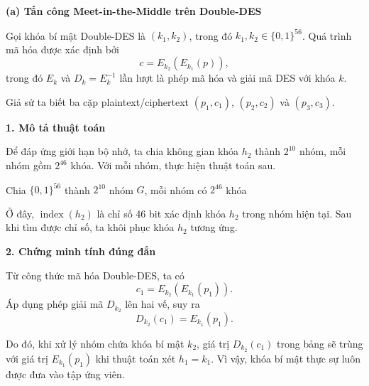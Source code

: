 \begin{loigiai}
\textbf{(a) Tấn công Meet-in-the-Middle trên Double-DES}

Gọi khóa bí mật Double-DES là $(k_1,k_2)$, trong đó
$k_1,k_2 \in \{0,1\}^{56}$. Quá trình mã hóa được xác định bởi
\[
c = E_{k_2}(E_{k_1}(p)),
\]
trong đó $E_k$ và $D_k=E_k^{-1}$ lần lượt là phép mã hóa
và giải mã DES với khóa $k$.

Giả sử ta biết ba cặp plaintext/ciphertext
$(p_1,c_1)$, $(p_2,c_2)$ và $(p_3,c_3)$.

\textbf{1. Mô tả thuật toán}

Để đáp ứng giới hạn bộ nhớ, ta chia không gian khóa $h_2$
thành $2^{10}$ nhóm, mỗi nhóm gồm $2^{46}$ khóa. Với mỗi
nhóm, thực hiện thuật toán sau.

\begin{algorithm}[H]
\caption{Tấn công Meet-in-the-Middle trên Double-DES}

Chia $\{0,1\}^{56}$ thành $2^{10}$ nhóm $G$, mỗi nhóm có
$2^{46}$ khóa\;

\end{algorithm}

Ở đây, $\operatorname{index}(h_2)$ là chỉ số 46 bit xác định
khóa $h_2$ trong nhóm hiện tại. Sau khi tìm được chỉ số,
ta khôi phục khóa $h_2$ tương ứng.

\textbf{2. Chứng minh tính đúng đắn}

Từ công thức mã hóa Double-DES, ta có
\[
c_1=E_{k_2}(E_{k_1}(p_1)).
\]
Áp dụng phép giải mã $D_{k_2}$ lên hai vế, suy ra
\[
D_{k_2}(c_1)=E_{k_1}(p_1).
\]

Do đó, khi xử lý nhóm chứa khóa bí mật $k_2$, giá trị
$D_{k_2}(c_1)$ trong bảng sẽ trùng với giá trị
$E_{k_1}(p_1)$ khi thuật toán xét $h_1=k_1$. Vì vậy,
khóa bí mật thực sự luôn được đưa vào tập ứng viên.


\end{loigiai}
